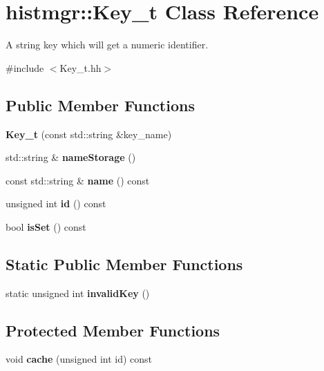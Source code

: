 \section{histmgr::Key\_\-t Class Reference}
\label{classhistmgr_1_1Key__t}


A string key which will get a numeric identifier.  


{\ttfamily \#include $<$Key\_\-t.hh$>$}\subsection*{Public Member Functions}
\begin{DoxyCompactItemize}
\item 
{\bfseries Key\_\-t} (const std::string \&key\_\-name)\label{classhistmgr_1_1Key__t_afce4e8a705f0f1a672177ba34000df14}

\item 
std::string \& {\bfseries nameStorage} ()\label{classhistmgr_1_1Key__t_ae94241f0863c94f48c8de3526b21a5ef}

\item 
const std::string \& {\bfseries name} () const \label{classhistmgr_1_1Key__t_afb953f811ee1274e7d8c96800760dcd1}

\item 
unsigned int {\bfseries id} () const \label{classhistmgr_1_1Key__t_a46ee73330ff61b8d100edad91614a6eb}

\item 
bool {\bfseries isSet} () const \label{classhistmgr_1_1Key__t_aa09f615fc00440b4a56902a3d3076d61}

\end{DoxyCompactItemize}
\subsection*{Static Public Member Functions}
\begin{DoxyCompactItemize}
\item 
static unsigned int {\bfseries invalidKey} ()\label{classhistmgr_1_1Key__t_a3f76a8ecb4e1226f9e598199d0c194a0}

\end{DoxyCompactItemize}
\subsection*{Protected Member Functions}
\begin{DoxyCompactItemize}
\item 
void {\bfseries cache} (unsigned int id) const \label{classhistmgr_1_1Key__t_a27779ea465a99d049b4e7f388b4ab3e5}

\end{DoxyCompactItemize}
